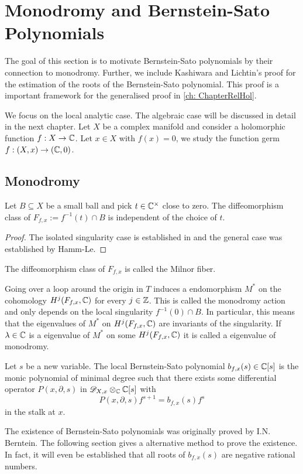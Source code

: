 \section{Monodromy and Bernstein-Sato Polynomials}\label{sec: MonodromyBS}
The goal of this section is to motivate Bernstein-Sato polynomials by their connection to monodromy.
Further, we include Kashiwara and Lichtin's proof for the estimation of the roots of the Bernstein-Sato polynomial.
This proof is a important framework for the generalised proof in \cref{ch: ChapterRelHol}.

We focus on the local analytic case.
The algebraic case will be discussed in detail in the next chapter.
Let $X$ be a complex manifold and consider a holomorphic function $f:X \to \mathbb{C}$.
Let $x\in X$ with $f(x) = 0$, we study the function germ $f:(X,x)\to (\mathbb{C},0)$.
\subsection{Monodromy}
\begin{theorem}
  Let $B\subseteq X$ be a small ball and pick $t\in \mathbb{C}^\times$ close to zero. The diffeomorphism class of $F_{f,x} := f^{-1}(t)\cap B $  is independent of the choice of $t$.
\end{theorem}
\begin{proof}
  The isolated singularity case is established in \cite{milnor2016singular} and the general case was established by Hamm-Le.
\end{proof}
\begin{definition}
  The diffeomorphism class of $F_{f,x}$ is called the Milnor fiber.
\end{definition}
Going over a loop around the origin in $T$ induces a endomorphism $M^*$ on the cohomology $H^j(F_{f,x},\mathbb{C})$ for every $j\in \mathbb{Z}$.
This is called the monodromy action and only depends on the local singularity $f^{-1}(0)\cap B$.
In particular, this means that the eigenvalues of $M^*$ on $H^j(F_{f,x},\mathbb{C})$ are invariants of the singularity.
If $\lambda \in \mathbb{C}$ is a eigenvalue of $M^*$ on some $H^j(F_{f,x},\mathbb{C})$ it is called a eigenvalue of monodromy.


\begin{definition}
  Let $s$ be a new variable.
  The local Bernstein-Sato polynomial $b_{f,x}(s)\in \mathbb{C}[s]$ is the monic polynomial of minimal degree such that there exists some differential operator $P(x,\partial,s)$ in $\mathscr{D}_{X,x}\otimes_{\mathbb{C}}\mathbb{C}[s]$ with
  $$P(x,\partial,s) f^{s+1} = b_{f,x}(s) f^s$$
  in the stalk at $x$.
\end{definition}
The existence of Bernstein-Sato polynomials was originally proved by I.N. Berntein.
The following section gives a alternative method to prove the existence.
In fact, it will even be established that all roots of $b_{f,x}(s)$ are negative rational numbers.

